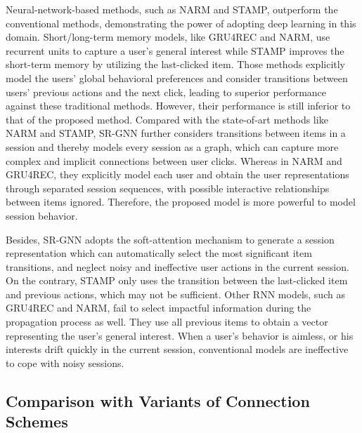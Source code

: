 \documentclass[letterpaper]{article} \usepackage{cite}
\begin{document}
Neural-network-based methods, such as NARM and STAMP, outperform the conventional methods, demonstrating the power of adopting deep learning in this domain. Short/long-term memory models, like GRU4REC and NARM, use recurrent units to capture a user's general interest while STAMP improves the short-term memory by utilizing the last-clicked item. Those methods explicitly model the users' global behavioral preferences and consider transitions between users' previous actions and the next click, leading to superior performance against these traditional methods. However, their performance is still inferior to that of the proposed method. Compared with the state-of-art methods like NARM and STAMP, SR-GNN further considers transitions between items in a session and thereby models every session as a graph, which can capture more complex and implicit connections between user clicks. Whereas in NARM and GRU4REC, they explicitly model each user and obtain the user representations through separated session sequences, with possible interactive relationships between items ignored. Therefore, the proposed model is more powerful to model session behavior.

Besides, SR-GNN adopts the soft-attention mechanism to generate a session representation which can automatically select the most significant item transitions, and neglect noisy and ineffective user actions in the current session. On the contrary, STAMP only uses the transition between the last-clicked item and previous actions, which may not be sufficient. Other RNN models, such as GRU4REC and NARM, fail to select impactful information during the propagation process as well. They use all previous items to obtain a vector representing the user's general interest. When a user's behavior is aimless, or his interests drift quickly in the current session, conventional models are ineffective to cope with noisy sessions.

\subsection{Comparison with Variants of Connection Schemes}
\end{document}
